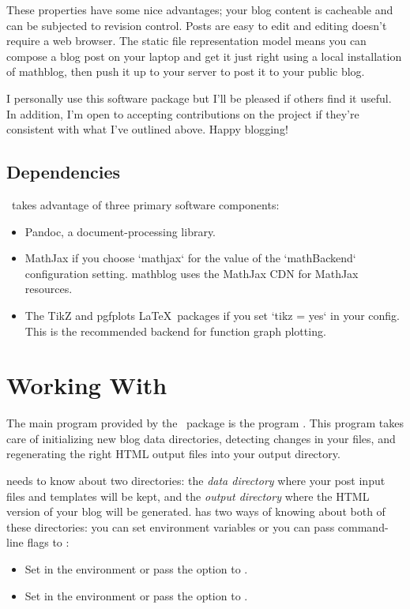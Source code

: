 \documentclass[11pt, letterpaper, oneside, titlepage]{book}
\begin{document}
These properties have some nice advantages; your blog content is
cacheable and can be subjected to revision control.  Posts are easy to
edit and editing doesn't require a web browser.  The static file
representation model means you can compose a blog post on your laptop
and get it just right using a local installation of mathblog, then
push it up to your server to post it to your public blog.

I personally use this software package but I'll be pleased if others
find it useful.  In addition, I'm open to accepting contributions on
the project if they're consistent with what I've outlined above.
Happy blogging!

\section{Dependencies}

\mathblog\ takes advantage of three primary software components:

\begin{itemize}
\item{Pandoc, a document-processing library.}
\item{MathJax if you choose `mathjax` for the value of the
  `mathBackend` configuration setting.  mathblog uses the MathJax CDN
  for MathJax resources.}
\item{The TikZ and pgfplots \LaTeX\ packages if you set `tikz = yes`
  in your config.  This is the recommended backend for function graph
  plotting.}
\end{itemize}

\chapter{Working With \mathblog}

The main program provided by the \mathblog\ package is the program
.  This program takes care of initializing new blog data
directories, detecting changes in your files, and regenerating the
right HTML output files into your output directory.

 needs to know about two directories: the \textit{data
  directory} where your post input files and templates will be kept,
and the \textit{output directory} where the HTML version of your blog
will be generated.   has two ways of knowing about both of
these directories: you can set environment variables or you can pass
command-line flags to :

\begin{itemize}
\item{Set  in the environment or pass the
   option to .}
\item{Set  in the environment or pass the
   option to .}
\end{itemize}
\end{document}
